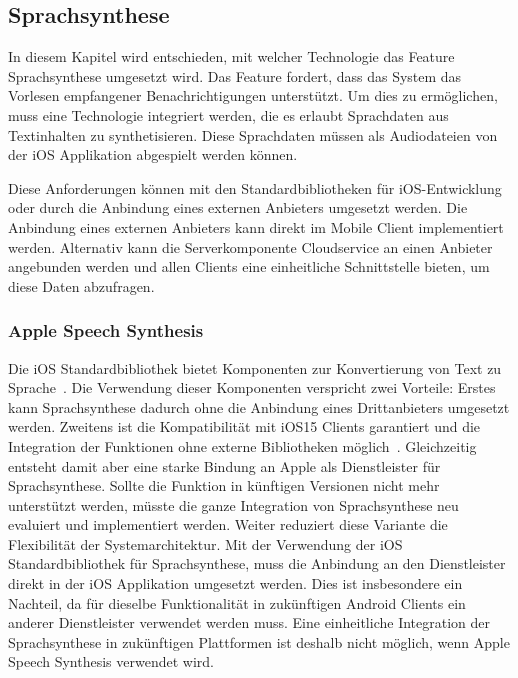 \subsection{Sprachsynthese}

In diesem Kapitel wird entschieden, mit welcher Technologie das Feature Sprachsynthese umgesetzt wird.
Das Feature fordert, dass das System das Vorlesen empfangener Benachrichtigungen unterstützt.
Um dies zu ermöglichen, muss eine Technologie integriert werden, die es erlaubt Sprachdaten aus Textinhalten zu synthetisieren.
Diese Sprachdaten müssen als Audiodateien von der iOS Applikation abgespielt werden können.

Diese Anforderungen können mit den Standardbibliotheken für iOS-Entwicklung oder durch die Anbindung eines externen Anbieters umgesetzt werden.
Die Anbindung eines externen Anbieters kann direkt im Mobile Client implementiert werden.
Alternativ kann die Serverkomponente Cloudservice an einen Anbieter angebunden werden und allen Clients eine einheitliche Schnittstelle bieten, um diese Daten abzufragen.

\subsubsection{Apple Speech Synthesis}

Die iOS Standardbibliothek bietet Komponenten zur Konvertierung von Text zu Sprache~\cite{ios_speech_synthesis}.
Die Verwendung dieser Komponenten verspricht zwei Vorteile:
Erstes kann Sprachsynthese dadurch ohne die Anbindung eines Drittanbieters umgesetzt werden.
Zweitens ist die Kompatibilität mit iOS15 Clients garantiert und die Integration der Funktionen ohne externe Bibliotheken möglich~\cite{ios_speech_synthesis}.
Gleichzeitig entsteht damit aber eine starke Bindung an Apple als Dienstleister für Sprachsynthese.
Sollte die Funktion in künftigen Versionen nicht mehr unterstützt werden, müsste die ganze Integration von Sprachsynthese neu evaluiert und implementiert werden.
Weiter reduziert diese Variante die Flexibilität der Systemarchitektur.
Mit der Verwendung der iOS Standardbibliothek für Sprachsynthese, muss die Anbindung an den Dienstleister direkt in der iOS Applikation umgesetzt werden.
Dies ist insbesondere ein Nachteil, da für dieselbe Funktionalität in zukünftigen Android Clients ein anderer Dienstleister verwendet werden muss.
Eine einheitliche Integration der Sprachsynthese in zukünftigen Plattformen ist deshalb nicht möglich, wenn Apple Speech Synthesis verwendet wird.

